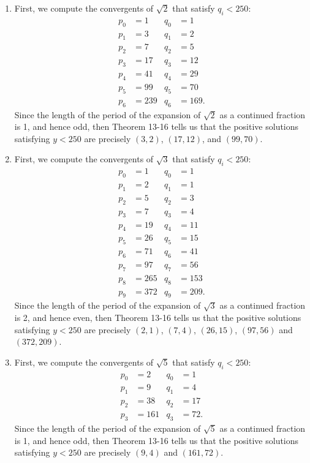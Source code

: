 \begin{solution}
    \begin{enumerate}
        \item First, we compute the convergents of $\sqrt{2}$ that satisfy $q_i < 250$:
         \begin{align*}
            p_0 &= 1 & q_0 &= 1 \\
            p_1 &= 3 & q_1 &= 2 \\
            p_2 &= 7 & q_2 &= 5 \\
            p_3 &= 17 & q_3 &= 12 \\
            p_4 &= 41 & q_4 &= 29 \\
            p_5 &= 99 & q_5 &= 70 \\
            p_6 &= 239 & q_6 &= 169.
        \end{align*}
        Since the length of the period of the expansion of $\sqrt{2}$ as a continued fraction is 1, and hence odd, then Theorem 13-16 tells us that the positive solutions satisfying $y < 250$ are precisely $(3,2)$, $(17, 12)$, and $(99,70)$.
        \item First, we compute the convergents of $\sqrt{3}$ that satisfy $q_i < 250$:
        \begin{align*}
            p_0 &= 1 & q_0 &= 1 \\
            p_1 &= 2 & q_1 &= 1 \\
            p_2 &= 5 & q_2 &= 3 \\
            p_3 &= 7 & q_3 &= 4 \\
            p_4 &= 19 & q_4 &= 11 \\
            p_5 &= 26 & q_5 &= 15 \\
            p_6 &= 71 & q_6 &= 41 \\
            p_7 &= 97 & q_7 &= 56 \\
            p_8 &= 265 & q_8 &= 153 \\
            p_9 &= 372 & q_9 &= 209.
        \end{align*}
        Since the length of the period of the expansion of $\sqrt{3}$ as a continued fraction is 2, and hence even, then Theorem 13-16 tells us that the positive solutions satisfying $y < 250$ are precisely $(2,1)$, $(7, 4)$, $(26,15)$, $(97,56)$ and $(372,209)$.
        \item First, we compute the convergents of $\sqrt{5}$ that satisfy $q_i < 250$:
        \begin{align*}
            p_0 &= 2 & q_0 &= 1 \\
            p_1 &= 9 & q_1 &= 4  \\
            p_2 &= 38 & q_2 &= 17 \\
            p_3 &= 161 & q_3 &= 72.
        \end{align*}
        Since the length of the period of the expansion of $\sqrt{5}$ as a continued fraction is 1, and hence odd, then Theorem 13-16 tells us that the positive solutions satisfying $y < 250$ are precisely $(9,4)$ and $(161, 72)$. \\
    \end{enumerate}
\end{solution}

